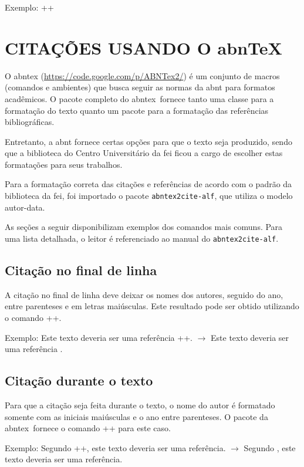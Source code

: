 \documentclass{fei}
\begin{document}
    Exemplo: \latexinline++

\chapter{CITAÇÕES USANDO O abn\TeX}\label{chap:referencia}

    O \gls{abntex} (\url{https://code.google.com/p/ABNTex2/}) é um conjunto de macros (comandos e ambientes) que busca seguir as normas da \gls{abnt} para formatos acadêmicos. O pacote completo do \gls{abntex}~fornece tanto uma classe para a formatação do texto quanto um pacote para a formatação das referências bibliográficas.

    Entretanto, a \gls{abnt} fornece certas opções para que o texto seja produzido, sendo que a biblioteca do Centro Universitário da \gls{fei} ficou a cargo de escolher estas formatações para seus trabalhos.

    Para a formatação correta das citações e referências de acordo com o padrão da biblioteca da \gls{fei}, foi importado o pacote \texttt{abntex2cite-alf}, que utiliza o modelo autor-data.

    As seções a seguir disponibilizam exemplos dos comandos mais comuns. Para uma lista detalhada, o leitor é referenciado ao manual do \texttt{abntex2cite-alf}.

    \section{Citação no final de linha}
    A citação no final de linha deve deixar os nomes dos autores, seguido do ano, entre parenteses e em letras maiúsculas. Este resultado pode ser obtido utilizando o comando \latexinline+\cite{obra}+.

    Exemplo: Este texto deveria ser uma referência \latexinline+\cite{j:turing50}+. $\to$ Este texto deveria ser uma referência \cite{j:turing50}.

    \section{Citação durante o texto}
    Para que a citação seja feita durante o texto, o nome do autor é formatado somente com as iniciais maiúsculas e o ano entre parenteses. O pacote da \gls{abntex}~fornece o comando \latexinline++ para este caso.

    Exemplo: Segundo \latexinline++, este texto deveria ser uma referência. $\to$ Segundo , este texto deveria ser uma referência.
	
\end{document}

